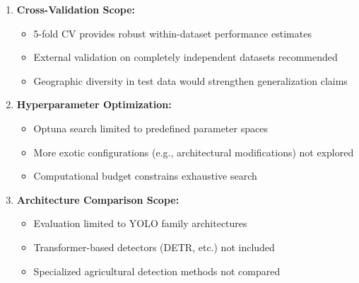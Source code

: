 \begin{enumerate}
    \item \textbf{Cross-Validation Scope:}
    \begin{itemize}
        \item 5-fold CV provides robust within-dataset performance estimates
        \item External validation on completely independent datasets recommended
        \item Geographic diversity in test data would strengthen generalization claims
    \end{itemize}
    
    \item \textbf{Hyperparameter Optimization:}
    \begin{itemize}
        \item Optuna search limited to predefined parameter spaces
        \item More exotic configurations (e.g., architectural modifications) not explored
        \item Computational budget constrains exhaustive search
    \end{itemize}
    
    \item \textbf{Architecture Comparison Scope:}
    \begin{itemize}
        \item Evaluation limited to YOLO family architectures
        \item Transformer-based detectors (DETR, etc.) not included
        \item Specialized agricultural detection methods not compared
    \end{itemize}
\end{enumerate}
